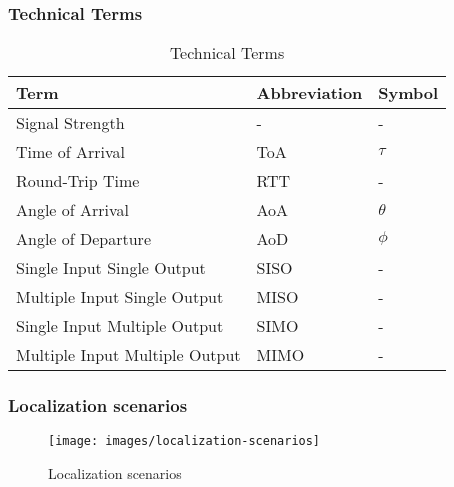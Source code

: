 \documentclass{beamer}
\begin{document}
\begin{frame}
	\frametitle{Technical Terms}
	\begin{table}[h!]
		\centering
		\begin{tabular}{lll}
			\toprule
			\textbf{Term} & \textbf{Abbreviation} & \textbf{Symbol} \\ 
			\midrule
			Signal Strength     & -                     & -               \\ 
			Time of Arrival     & ToA                   & $\tau$          \\ 
			Round-Trip Time     & RTT                   & -               \\ 
			Angle of Arrival    & AoA                   & $\theta$        \\ 
			Angle of Departure  & AoD                   & $\phi$          \\ 
			\midrule
			Single Input Single Output   & SISO                  & -               \\ 
			Multiple Input Single Output   & MISO                  & -               \\ 
			Single Input Multiple Output   & SIMO                  & -               \\ 
			Multiple Input Multiple Output   & MIMO                  & -               \\ 
			\bottomrule
		\end{tabular}
		\caption{Technical Terms}
	\end{table}
\end{frame}

\begin{frame}
	\frametitle{Localization scenarios}	

	\begin{figure}
		\centering
		\texttt{[image: images/localization-scenarios]}
		\caption{Localization scenarios}
		\label{fig:localization-scenarios}
	\end{figure}
\end{frame}
\end{document}
